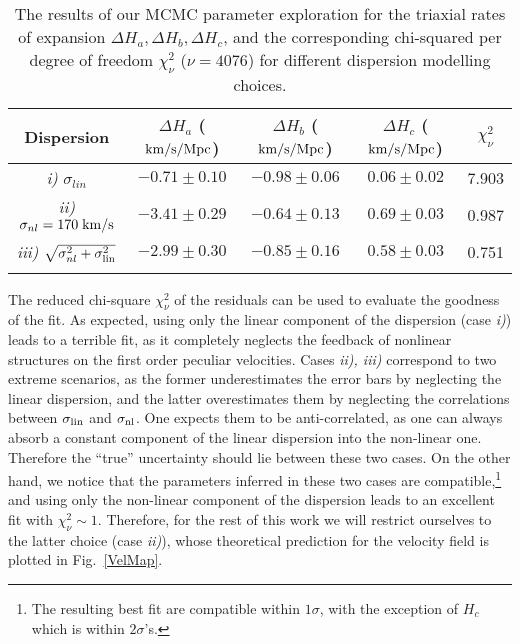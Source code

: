\documentclass[notitlepage,nofootinbib]{revtex4-1}
\begin{document}
\begin{table}[h]
\centering
\begin{tabular}{|c|cccc|}
\hhline{|=====|}
Dispersion & $\Delta H_a$ ($\rm{km}/\rm{s}/\rm{Mpc}$) & $\Delta H_b$ ($\rm{km}/\rm{s}/\rm{Mpc}$) & $\Delta H_c$ ($\rm{km}/\rm{s}/\rm{Mpc}$) & $\chi^2_\nu$ \\\hline
\textit{i)} $\sigma_{lin}$  & $-0.71 \pm 0.10$ & $-0.98 \pm 0.06$ & $0.06 \pm 0.02$ & 7.903  \\
\textit{ii)} $\sigma_{nl}=170 \; \rm{km}/\rm{s}$  & $-3.41 \pm 0.29$ & $-0.64 \pm 0.13$ & $0.69 \pm 0.03$ & 0.987 \\
\textit{iii)} $\sqrt{\sigma_{nl}^2 +\sigma_{\rm{lin}}^2}$  & $-2.99 \pm 0.30$ & $-0.85 \pm 0.16$ & $0.58 \pm 0.03$ & 0.751 \\
\hhline{|=====|}
\end{tabular}
\caption{The results of our MCMC parameter exploration for the triaxial rates of expansion $\Delta H_a,\Delta H_b,\Delta H_c$, and the corresponding chi-squared per degree of freedom  $\chi^2_\nu$ ($\nu =4076$)  for different dispersion modelling choices.}
\label{modelbestfits}
\end{table}
The reduced chi-square $\chi^2_{\nu}$ of the residuals can be used to evaluate the goodness of the fit. As expected, using only the linear component of the dispersion (case \textit{i)}) leads to a terrible fit, as it completely neglects the feedback of nonlinear structures on the first order peculiar velocities. Cases \textit{ ii), iii)} correspond to two extreme scenarios, as the former underestimates the error bars by neglecting the linear dispersion, and the latter overestimates them by neglecting the correlations between $\sigma_{\rm{lin}}$ and $\sigma_{\rm{nl}}$. One expects them to be anti-correlated, as one can always absorb a constant component of the linear dispersion into the non-linear one. Therefore the ``true'' uncertainty should lie between these two cases. On the other hand, we notice that the parameters inferred in these two cases are compatible,\footnote{The resulting best fit are compatible within $1\sigma $, with the exception of $H_c$ which is within $2\sigma$'s.} and using only the non-linear component of the dispersion leads to an excellent fit with $\chi^2_{\nu}\sim 1$. Therefore, for the rest of this work we will restrict ourselves to the latter choice (case \textit{ii)}), whose theoretical prediction for the velocity field is plotted in Fig.~\ref{VelMap}. 
\end{document}
